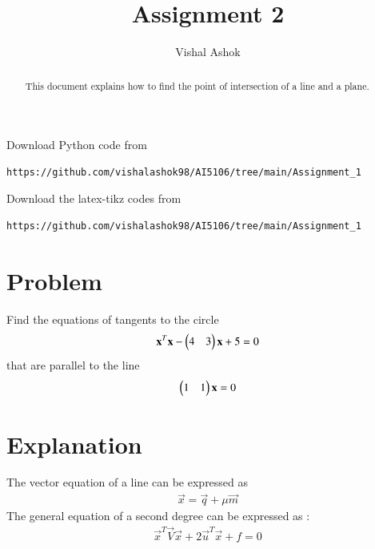 \documentclass[journal,12pt,twocolumn]{IEEEtran}
\begin{document}
\renewcommand{\thefigure}{\theproblem}
\def\putbox#1#2#3{\makebox[0in][l]{\makebox[#1][l]{}\raisebox{\baselineskip}[0in][0in]{\raisebox{#2}[0in][0in]{#3}}}}
     \def\rightbox#1{\makebox[0in][r]{#1}}
     \def\centbox#1{\makebox[0in]{#1}}
     \def\topbox#1{\raisebox{-\baselineskip}[0in][0in]{#1}}
     \def\midbox#1{\raisebox{-0.5\baselineskip}[0in][0in]{#1}}
\vspace{3cm}
\title{Assignment 2}
\author{Vishal Ashok}
\maketitle
\newpage
\bigskip
\renewcommand{\thefigure}{\theenumi}
\renewcommand{\thetable}{\theenumi}
\begin{abstract}
This document explains how to find the point of intersection of a line and a plane.
\end{abstract}
Download Python code from 
%
\begin{lstlisting}
https://github.com/vishalashok98/AI5106/tree/main/Assignment_1
\end{lstlisting}
%
Download the latex-tikz codes from 
%
\begin{lstlisting}
https://github.com/vishalashok98/AI5106/tree/main/Assignment_1
\end{lstlisting}
%

\section{Problem}
Find the equations of tangents to the circle 
\begin{align}
\mathbf{x}^T\mathbf{x}-\begin{pmatrix}4 & 3\end{pmatrix}\mathbf{x}+5 = 0 \label{given_circle_eq}
\end{align}
that are parallel to the line
\begin{align}
\begin{pmatrix}1 &1\end{pmatrix}\mathbf{x}=0 \label{given_line_eq}
\end{align}





	
	



\section{Explanation}
The vector equation of a line can be expressed as 
\begin{align}
    \vec{x} = \vec{q} +\mu\vec{m} \label{vec_eqn_of_line}
\end{align}
The general equation of a second degree can be expressed as :
\begin{align}
\vec{x}^T\vec{V}\vec{x}+2\vec{u}^T\vec{x}+f=0\label{gen__quad_eqn}
\end{align}
\end{document}
